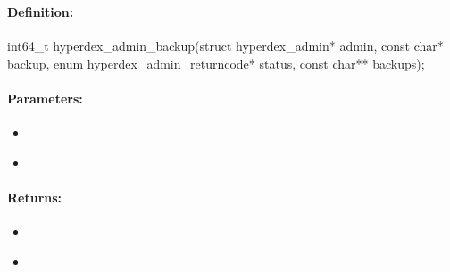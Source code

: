 \pagebreak
\subsubsection{}
\label{api:c:backup}


\paragraph{Definition:}
\begin{ccode}
int64_t hyperdex_admin_backup(struct hyperdex_admin* admin,
        const char* backup,
        enum hyperdex_admin_returncode* status,
        const char** backups);
\end{ccode}

\paragraph{Parameters:}
\begin{itemize}[noitemsep]
\item {}\\

\item {}\\

\end{itemize}

\paragraph{Returns:}
\begin{itemize}[noitemsep]
\item {}\\

\item {}\\

\end{itemize}

\pagebreak
\subsubsection{}
\label{api:c:enable_perf_counters}


